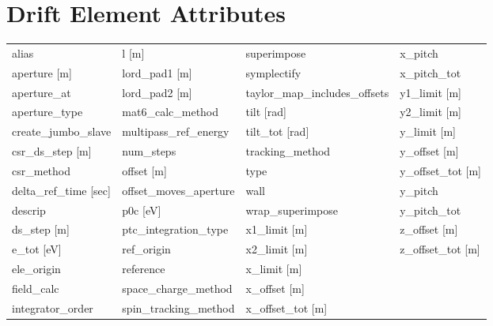  \section{Drift Element Attributes}
 \label{s:list.drift}
 
 \begin{tabular}{llll} \toprule
alias                            & l [m]                            & superimpose                      & x_pitch                          \\
aperture [m]                     & lord_pad1 [m]                    & symplectify                      & x_pitch_tot                      \\
aperture_at                      & lord_pad2 [m]                    & taylor_map_includes_offsets      & y1_limit [m]                     \\
aperture_type                    & mat6_calc_method                 & tilt [rad]                       & y2_limit [m]                     \\
create_jumbo_slave               & multipass_ref_energy             & tilt_tot [rad]                   & y_limit [m]                      \\
csr_ds_step [m]                  & num_steps                        & tracking_method                  & y_offset [m]                     \\
csr_method                       & offset [m]                       & type                             & y_offset_tot [m]                 \\
delta_ref_time [sec]             & offset_moves_aperture            & wall                             & y_pitch                          \\
descrip                          & p0c [eV]                         & wrap_superimpose                 & y_pitch_tot                      \\
ds_step [m]                      & ptc_integration_type             & x1_limit [m]                     & z_offset [m]                     \\
e_tot [eV]                       & ref_origin                       & x2_limit [m]                     & z_offset_tot [m]                 \\
ele_origin                       & reference                        & x_limit [m]                      &                                  \\
field_calc                       & space_charge_method              & x_offset [m]                     &                                  \\
integrator_order                 & spin_tracking_method             & x_offset_tot [m]                 &                                  \\
 \bottomrule
 \end{tabular}
 \vfill
 
